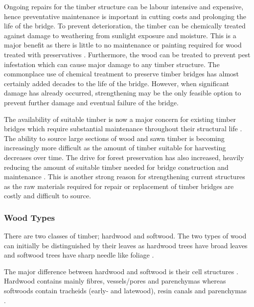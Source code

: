 \documentclass[11pt,a4paper]{article}
\numberwithin{equation}{subsection}
\begin{document}
	\vspace*{\baselineskip}
	
	\noindent
	Ongoing repairs for the timber structure can be labour intensive and expensive, hence preventative maintenance is important in cutting costs and prolonging the life of the bridge. To prevent deterioration, the timber can be chemically treated against damage to weathering from sunlight exposure and moisture. This is a major benefit as there is little to no maintenance or painting required for wood treated with preservatives \cite{ritter_timber_1990}. Furthermore, the wood can be treated to prevent pest infestation \cite{_timber_2005,ritter_timber_1990} which can cause major damage to any timber structure. The commonplace use of chemical treatment to preserve timber bridges has almost certainly added decades to the life of the bridge. However, when significant damage has already occurred, strengthening may be the only feasible option to prevent further damage and eventual failure of the bridge.
	
	\vspace*{\baselineskip}
	
	\noindent
	The availability of suitable timber is now a major concern for existing timber bridges which require substantial maintenance throughout their structural life \cite{_timber_2005}. The ability to source large sections of wood and sawn timber is becoming increasingly more difficult as the amount of timber suitable for harvesting decreases over time. The drive for forest preservation has also increased, heavily reducing the amount of suitable timber needed for bridge construction and maintenance \cite{_timber_2005,ritter_timber_1990}. This is another strong reason for strengthening current structures as the raw materials required for repair or replacement of timber bridges are costly and difficult to source.
	
	\subsubsection{Wood Types}
	There are two classes of timber; hardwood and softwood. The two types of wood can initially be distinguished by their leaves as hardwood trees have broad leaves and softwood trees have sharp needle like foliage \cite{dunningham_review_2015}. 
	
	\vspace*{\baselineskip}
	
	\noindent
	The major difference between hardwood and softwood is their cell structures \cite{stalnaker_structural_2013}. Hardwood contains mainly fibres, vessels/pores and parenchymas whereas softwoods contain tracheids (early- and latewood), resin canals and parenchymas \cite{cresswell_product_2004}.
	
\end{document}
